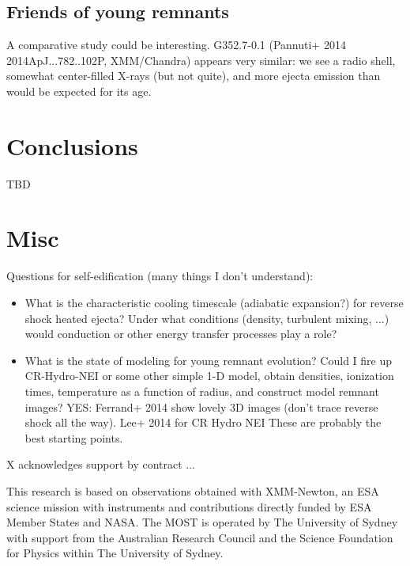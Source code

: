 \documentclass[preprint2,tighten,trackchanges]{aastex6}
\begin{document}

\subsection{Friends of young remnants}

A comparative study could be interesting.
G352.7-0.1 (Pannuti+ 2014 2014ApJ...782..102P, XMM/Chandra) appears very
similar: we see a radio shell, somewhat center-filled X-rays (but not quite),
and more ejecta emission than would be expected for its age.

\section{Conclusions}

TBD

\section{Misc}

Questions for self-edification (many things I don't understand):
\begin{itemize}
    \item What is the characteristic cooling timescale (adiabatic expansion?)
        for reverse shock heated ejecta?
        Under what conditions (density, turbulent mixing, ...)
        would conduction or other energy transfer processes play a role?
    \item What is the state of modeling for young remnant evolution?
        Could I fire up CR-Hydro-NEI or some other simple 1-D model,
        obtain densities, ionization times, temperature as a function of
        radius, and construct model remnant images?
        YES: Ferrand+ 2014 show lovely 3D images (don't trace reverse shock all
        the way).
        Lee+ 2014 for CR Hydro NEI
        These are probably the best starting points.
\end{itemize}

\acknowledgments

X acknowledges support by contract ...

This research is based on observations obtained with XMM-Newton, an ESA science
mission with instruments and contributions directly funded by ESA Member States
and NASA.
The MOST is operated by The University of Sydney with support from the
Australian Research Council and the Science Foundation for Physics within The
University of Sydney.
\end{document}
